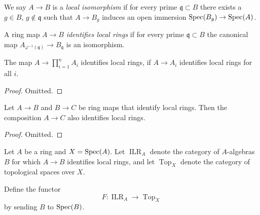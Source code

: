 \begin{definition}
  \label{def:local-isomorphism}
  \leanok
  We say $A \to B$ is a \emph{local isomorphism} if for every prime $\mathfrak{q} \subset B$ there exists a $g \in B$, $g \notin \mathfrak{q}$ such that $A \to B_g$ induces an open immersion $\operatorname{Spec} (B_g) \to \operatorname{Spec} (A)$.
\end{definition}

\begin{definition}
  A ring map $A \to B$ \emph{identifies local rings} if for every prime $\mathfrak{q} \subset B$ the canonical map $A_{\varphi^{-1}(\mathfrak{q})} \to B_{\mathfrak{q}}$ is an isomorphism.
  \label{def:identify-local-rings}
  \leanok
\end{definition}

\begin{lemma}
  \label{thm:finite-product-identifies-local-rings}
  The map \(A \to \prod_{i = 1}^{n} A_i \) identifies local rings, if \(A \to A_i\) identifies local rings for all \(i\).
\end{lemma}

\begin{proof}
  Omitted.
\end{proof}

\begin{lemma}
  \label{thm:identifies-local-rings-composition}
  Let \(A \to B\) and \(B \to C\) be ring maps that identify local rings. Then the composition \(A \to C\) also identifies local rings.
\end{lemma}

\begin{proof}
  Omitted.
\end{proof}

\begin{definition}{\cite[\href{https://stacks.math.columbia.edu/tag/096L}{Tag 096L}]{stacks-project}}
  \label{def:identifies-local-ring-to-top}
  Let $A$ be a ring and $X = \operatorname{Spec}(A)$. Let $\operatorname{ILR}_A$ denote the category of $A$-algebras $B$ for which $A \to B$ identifies local rings, and let $\operatorname{Top}_X$ denote the category of topological spaces over $X$.
  
  Define the functor
  \[
  F \colon \operatorname{ILR}_A \longrightarrow \operatorname{Top}_X
  \]
  by sending $B$ to $\operatorname{Spec}(B)$.
\end{definition}

